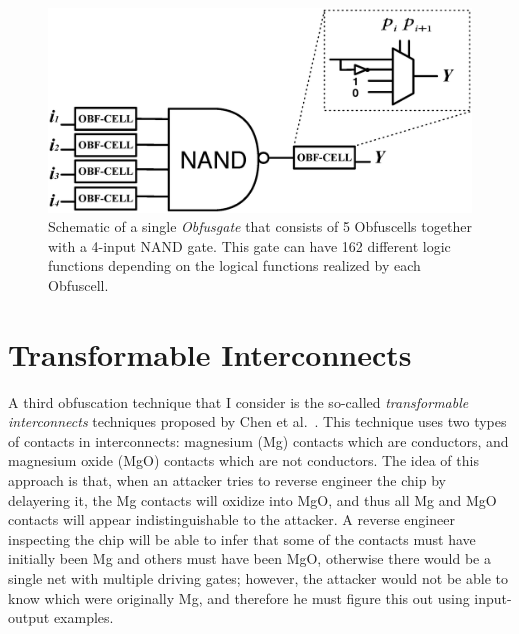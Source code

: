 \documentclass[proposal]{umassthesis}  %
\begin{document}
\begin{figure}[t] 
\begin{center}
\includegraphics[scale=0.5]{figures/obfus_cell.eps}
\caption{Schematic of a single \textit{Obfusgate} that consists of 5 Obfuscells together with a 4-input NAND gate. This gate can have 162 different logic functions depending on the logical functions realized by each Obfuscell.}
\label{fig:obfuscell}
\end{center}
\end{figure}



















\section{Transformable Interconnects}

A third obfuscation technique that I consider is the so-called \textit{transformable interconnects} techniques proposed by Chen et al.~\cite{chen-2015-dummyWire}. This technique uses two types of contacts in interconnects: magnesium (Mg) contacts which are conductors, and magnesium oxide (MgO) contacts which are not conductors. The idea of this approach is that, when an attacker tries to reverse engineer the chip by delayering it, the Mg contacts will oxidize into MgO, and thus all Mg and MgO contacts will appear indistinguishable to the attacker. A reverse engineer inspecting the chip will be able to infer that some of the contacts must have initially been Mg and others must have been MgO, otherwise there would be a single net with multiple driving gates; however, the attacker would not be able to know which were originally Mg, and therefore he must figure this out using input-output examples.
\end{document}
